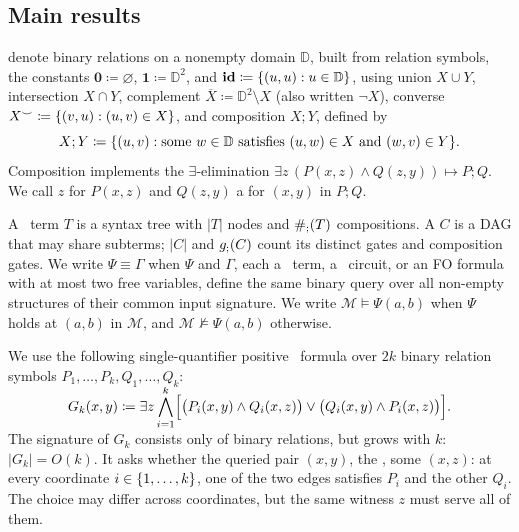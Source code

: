 \subsection{Main results}\label{sec:main-results}

\def\cordom{\mathbb{D}}

 denote binary relations on a nonempty domain $\cordom$,
built from relation symbols,
the constants
$\mathbf{0} \coloneqq \varnothing$, 
$\mathbf{1} \coloneqq \cordom^2$,
and $\id \coloneqq \set{(u,u) : u\in \cordom}$,
using union $X \cup Y$, intersection $X \cap Y$, 
complement $\overline X \coloneqq \cordom^2\setminus X$ (also written $\neg X$),
converse $X^\smile \coloneqq \{ (v,u):(u,v)\in X \}$, and composition $X;Y$, defined by
\[
X;Y \coloneqq \set{(u,v):\text{some }w\in\cordom\text{ satisfies }
 (u,w)\in X \text{ and } (w,v)\in Y}.
\]
Composition implements the $\exists$-elimination
$\exists z\,(P(x,z)\land Q(z,y)) \mapsto P;Q$.
We call $z$ for $P(x,z)$ and $Q(z,y)$ a  for $(x,y)$ in $P ; Q$.

\smallskip
{}
A \CoR\ term $T$ is a syntax tree with $|T|$ nodes and $\#_{;}(T)$ compositions.
A  $C$ is a DAG that may share subterms;
$|C|$ and $g_{;}(C)$ count its distinct gates and composition gates.
We write $\Psi\equiv\Gamma$
when $\Psi$ and $\Gamma$,
each a \CoR\ term, a \CoR\ circuit, or an FO formula
with at most two free variables,
define the same binary query over all non-empty structures of their common input signature.
%
We write $\mathcal M\models\Psi(a,b)$ when $\Psi$ holds at $(a,b)$ in $\mathcal M$, and $\mathcal M\not\models\Psi(a,b)$ otherwise.

\smallskip
{}
We use the following single-quantifier positive \FOthree\ formula over $2k$ binary relation symbols $P_1,\ldots,P_k,Q_1,\ldots,Q_k$:
\[
 G_k(x,y)\coloneqq\exists z\,\smash{\bigwedge_{i=1}^k}
 \Bigl[\bigl(P_i(x,y)\land Q_i(x,z)\bigr)\lor\bigl(Q_i(x,y)\land P_i(x,z)\bigr)\Bigr].
\]
The signature of $G_k$ consists only of binary relations, but grows with $k$: $|G_k| = O(k)$.
It asks whether the queried pair $(x,y)$, the ,  some  $(x,z)$: at every coordinate $i\in\{ 1,\ldots,k \}$, one of the two edges satisfies $P_i$ and the other $Q_i$.
The choice may differ across coordinates, but the same witness $z$ must serve all of them.

